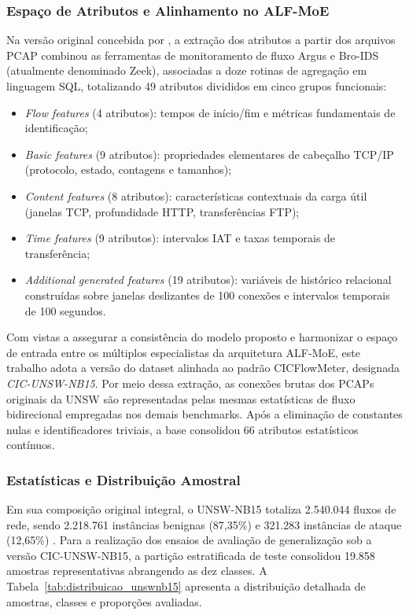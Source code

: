 \subsubsection{Espaço de Atributos e Alinhamento no ALF-MoE}

Na versão original concebida por , a extração dos atributos a partir dos arquivos PCAP combinou as ferramentas de monitoramento de fluxo Argus e Bro-IDS (atualmente denominado Zeek), associadas a doze rotinas de agregação em linguagem SQL, totalizando 49 atributos divididos em cinco grupos funcionais:
\begin{itemize}
    \item \emph{Flow features} (4 atributos): tempos de início/fim e métricas fundamentais de identificação;
    \item \emph{Basic features} (9 atributos): propriedades elementares de cabeçalho TCP/IP (protocolo, estado, contagens e tamanhos);
    \item \emph{Content features} (8 atributos): características contextuais da carga útil (janelas TCP, profundidade HTTP, transferências FTP);
    \item \emph{Time features} (9 atributos): intervalos IAT e taxas temporais de transferência;
    \item \emph{Additional generated features} (19 atributos): variáveis de histórico relacional construídas sobre janelas deslizantes de 100 conexões e intervalos temporais de 100 segundos.
\end{itemize}

Com vistas a assegurar a consistência do modelo proposto e harmonizar o espaço de entrada entre os múltiplos especialistas da arquitetura ALF-MoE, este trabalho adota a versão do dataset alinhada ao padrão CICFlowMeter, designada \emph{CIC-UNSW-NB15}. Por meio dessa extração, as conexões brutas dos PCAPs originais da UNSW são representadas pelas mesmas estatísticas de fluxo bidirecional empregadas nos demais benchmarks. Após a eliminação de constantes nulas e identificadores triviais, a base consolidou 66 atributos estatísticos contínuos.

\subsubsection{Estatísticas e Distribuição Amostral}

Em sua composição original integral, o UNSW-NB15 totaliza 2.540.044 fluxos de rede, sendo 2.218.761 instâncias benignas (87,35\%) e 321.283 instâncias de ataque (12,65\%) \cite{standard2021}. Para a realização dos ensaios de avaliação de generalização sob a versão CIC-UNSW-NB15, a partição estratificada de teste consolidou 19.858 amostras representativas abrangendo as dez classes. A Tabela~\ref{tab:distribuicao_unswnb15} apresenta a distribuição detalhada de amostras, classes e proporções avaliadas.

